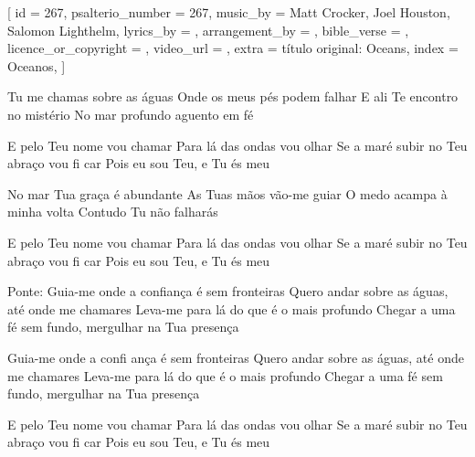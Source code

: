 [
    id                     = {267},
    psalterio_number       = {267},
    music_by               = {Matt Crocker, Joel Houston, Salomon Lighthelm},
    lyrics_by              = {},
    arrangement_by         = {},
    bible_verse            = {},
    licence_or_copyright   = {},
    video_url              = {},
    extra                  = {título original: Oceans},
    index                  = {Oceanos},
]


\beginverse
Tu me chamas sobre as águas
Onde os meus pés podem falhar
E ali Te encontro no mistério
No mar profundo aguento em fé
\endverse


\beginchorus
E pelo Teu nome vou chamar
Para lá das ondas vou olhar
Se a maré subir no Teu abraço vou fi car
Pois eu sou Teu, e Tu és meu
\endchorus


\beginverse
No mar Tua graça é abundante
As Tuas mãos vão-me guiar
O medo acampa à minha volta
Contudo Tu não falharás
\endverse


\beginchorus
E pelo Teu nome vou chamar
Para lá das ondas vou olhar
Se a maré subir no Teu abraço vou fi car
Pois eu sou Teu, e Tu és meu
\endchorus


\beginverse
Ponte:
Guia-me onde a confiança é sem fronteiras
Quero andar sobre as águas, até onde me chamares
Leva-me para lá do que é o mais profundo
Chegar a uma fé sem fundo, mergulhar na Tua presença

Guia-me onde a confi ança é sem fronteiras
Quero andar sobre as águas, até onde me chamares
Leva-me para lá do que é o mais profundo
Chegar a uma fé sem fundo, mergulhar na Tua presença
\endverse



\beginchorus
E pelo Teu nome vou chamar
Para lá das ondas vou olhar
Se a maré subir no Teu abraço vou fi car
Pois eu sou Teu, e Tu és meu
\endchorus

\endsong

